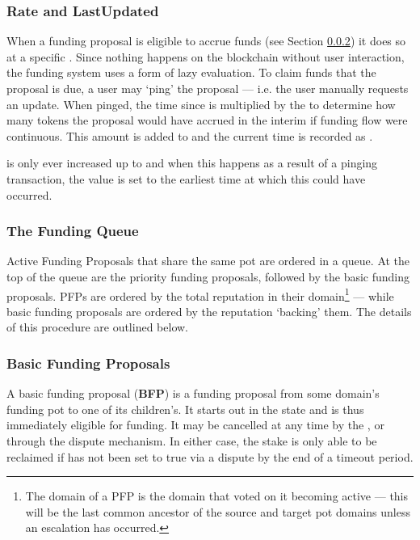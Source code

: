 \subsubsection{Rate and LastUpdated}
When a funding proposal is eligible to accrue funds (see Section \ref{subsec:funding-queue}) it does so at a specific . Since nothing happens on the blockchain without user interaction, the funding system uses a form of lazy evaluation. To claim funds that the proposal is due, a user may `ping' the proposal --- i.e. the user manually requests an update. When pinged, the time since  is multiplied by the  to determine how many tokens the proposal would have accrued in the interim if funding flow were continuous. This amount is added to  and the current time is recorded as .

 is only ever increased up to  and when this happens as a result of a pinging transaction, the  value is set to the earliest time at which this could have occurred.

\subsubsection{The Funding Queue}\label{subsec:funding-queue}
Active Funding Proposals that share the same  pot are ordered in a queue. At the top of the queue are the priority funding proposals, followed by the basic funding proposals. PFPs are ordered by the total reputation in their domain\footnote{The domain of a PFP is the domain that voted on it becoming active --- this will be the last common ancestor of the source and target pot domains unless an escalation has occurred.} --- while basic funding proposals are ordered by the reputation `backing' them.  The details of this procedure are outlined below.

%
%
%

\subsubsection{Basic Funding Proposals}\label{subsubsec:BFPs}
A basic funding proposal (\textbf{BFP}) is a funding proposal from some domain's funding pot to one of its children's. It starts out in the  state and is thus immediately eligible for funding. It may be cancelled at any time by the , or through the dispute mechanism. In either case, the stake is only able to be reclaimed if  has not been set to true via a dispute by the end of a timeout period.

